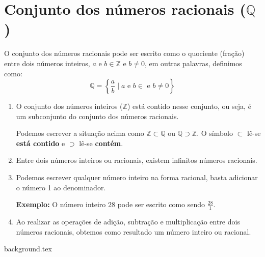 \documentclass[10pt]{article}
\begin{document}
\section*{Conjunto dos números racionais (\( \mathbb{Q} \))}
O conjunto dos números racionais pode ser escrito como o quociente (fração) entre dois números inteiros, \( a \) e \(  b \in \mathbb{Z} \) e \( b \neq 0 \), em outras palavras, definimos como:
\[ \mathbb{Q} = \left\{ \frac{a}{b} \mid  a \textrm{ e } b \in \textrm{ e } b \neq 0 \right\} \]

\begin{enumerate}[label=\textbf{(\Roman*)}]
        \item O conjunto dos números inteiros (\(\mathbb{Z}\)) está contido nesse conjunto, ou seja, é um subconjunto do conjunto dos números racionais.
        \begin{obs}
        Podemos escrever a situação acima como \( \mathbb{Z} \subset \mathbb{Q} \) ou \( \mathbb{Q} \supset \mathbb{Z} \). O símbolo \( \subset \) lê-se \textbf{está contido} e \( \supset \) lê-se \textbf{contém}.
        \end{obs}
        \item Entre dois números inteiros ou racionais, existem infinitos números racionais.
        \item Podemos escrever qualquer número inteiro na forma racional, basta adicionar o número 1 ao denominador.
        
        \textbf{Exemplo:} O número inteiro \( 28 \) pode ser escrito como sendo \( \frac{28}{1} \).
        \item  Ao realizar as operações de adição, subtração e multiplicação entre dois números racionais, obtemos como resultado um número inteiro ou racional.
\end{enumerate}
\newpage
{background.tex} %
\end{document}
